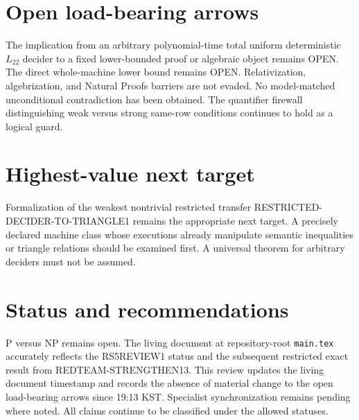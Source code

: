 \documentclass[11pt]{article}
\begin{document}
\section{Open load-bearing arrows}
The implication from an arbitrary polynomial-time total uniform deterministic $L_{22}$ decider to a fixed lower-bounded proof or algebraic object remains OPEN. The direct whole-machine lower bound remains OPEN. Relativization, algebrization, and Natural Proofs barriers are not evaded. No model-matched unconditional contradiction has been obtained. The quantifier firewall distinguishing weak versus strong same-row conditions continues to hold as a logical guard.

\section{Highest-value next target}
Formalization of the weakest nontrivial restricted transfer RESTRICTED-DECIDER-TO-TRIANGLE1 remains the appropriate next target. A precisely declared machine class whose executions already manipulate semantic inequalities or triangle relations should be examined first. A universal theorem for arbitrary deciders must not be assumed.

\section{Status and recommendations}
P versus NP remains open. The living document at repository-root \texttt{main.tex} accurately reflects the RS5REVIEW1 status and the subsequent restricted exact result from REDTEAM-STRENGTHEN13. This review updates the living document timestamp and records the absence of material change to the open load-bearing arrows since 19:13 KST. Specialist synchronization remains pending where noted. All claims continue to be classified under the allowed statuses.

\end{document}
